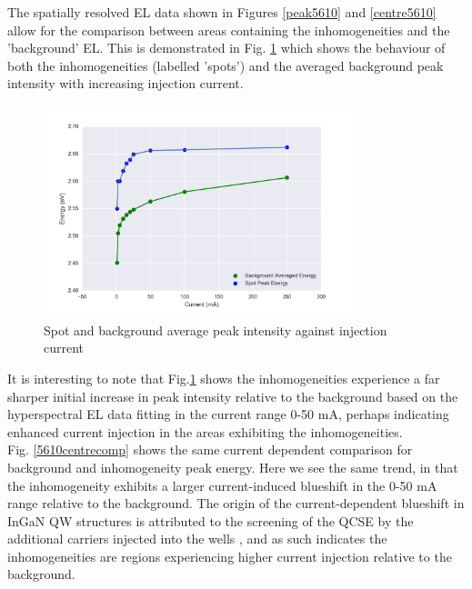 The spatially resolved EL data shown in Figures \ref{peak5610} and \ref{centre5610} allow for the comparison between areas containing the inhomogeneities and the 'background' EL. This is demonstrated in Fig. \ref{5610peakcomp} which shows the behaviour of both the inhomogeneities (labelled 'spots') and the averaged background peak intensity with increasing injection current.
\begin{figure}[!ht]
	\centering
	\includegraphics[width=0.8\textwidth]{Figs/Ch3/centrePeakcomp5608.png}
	\caption[h] {Spot and background average peak intensity against injection current}
	\label{5610peakcomp}
\end{figure}

\FloatBarrier 
It is interesting to note that Fig.\ref{5610peakcomp} shows the inhomogeneities experience a far sharper initial increase in peak intensity relative to the background based on the hyperspectral EL data fitting in the current range 0-50 mA, perhaps indicating enhanced current injection in the areas exhibiting the inhomogeneities.\\
Fig. \ref{5610centrecomp} shows the same current dependent comparison for background and inhomogeneity peak energy. Here we see the same trend, in that the inhomogeneity exhibits a larger current-induced blueshift in the 0-50 mA range relative to the background. The origin of the current-dependent blueshift in InGaN QW structures is attributed to the screening of the QCSE by the additional carriers injected into the wells \cite{Ryou2009}, and as such indicates the inhomogeneities are regions experiencing higher current injection relative to the background.

